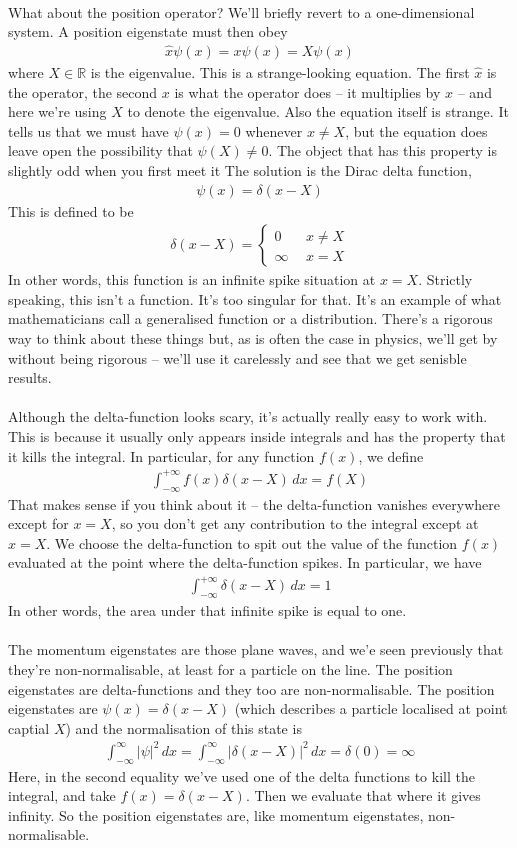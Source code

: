 \documentclass[12pt]{article}
\def\be{\begin{eqnarray}}
\def\ee{\end{eqnarray}}
\newcommand{\nn}{\nonumber}
\newcommand\para{\paragraph{}}
\newcommand{\co}{\color{olive}}
\begin{document}
{\para
What about the position operator? We'll briefly revert to a one-dimensional system. {\co A position eigenstate must then obey
%
\be  \hat{x}\psi(x) = x\psi(x) = X\psi(x)\nn\ee
%
where $X\in \mathds{R}$ is the eigenvalue.} This is a strange-looking equation. The first $\hat{x}$ is the operator, the second $x$ is what the operator does -- it multiplies by $x$ -- and here we're using $X$ to denote the eigenvalue. Also the equation itself is strange. It tells us that we must  have $\psi(x)=0$ whenever $x\neq X$, but the equation does leave open the possibility that $\psi(X)\neq 0$. The object that has this property is slightly odd when you first meet it {\co The solution  is the Dirac delta function,
%
\be \psi(x) = \delta(x-X)\nn\ee
% 
This is defined to be 
%
\be \delta(x-X) = \left\{\begin{array}{cc} 0 \ \ & x\neq X\\ \infty \ \ & x=X\end{array}\right.\nn\ee
%
} In other words, this function is an infinite spike situation at $x=X$. Strictly speaking, this isn't a function. It's too singular for that. It's an example of what mathematicians call a generalised function or a distribution. There's a rigorous way to think about these things but, as is often the case in physics, we'll get by without being rigorous -- we'll use it carelessly and see that we get senisble results. 

\para
Although the delta-function looks scary, it's actually really easy to work with. This is because it usually only appears inside integrals and has the property that it kills the integral. In particular, {\co for any function $f(x)$, we define
%
\be \int_{-\infty}^{+\infty} f(x) \delta(x-X) \,dx = f(X)\nn\ee
%
}
That makes sense if you think about it -- the delta-function vanishes everywhere except for $x=X$, so you don't get any contribution to the integral except at $x=X$. We choose the delta-function to spit out the value of the function $f(x)$ evaluated at the point where the delta-function spikes. {\co In particular, we have
%
\be \int_{-\infty}^{+\infty} \delta(x-X) \, dx=1\nn\ee
%
In other words, the area under that infinite spike is equal to one.}


\para
The momentum eigenstates are those plane waves, and we'e seen previously that they're non-normalisable, at least for a particle on the line. The position eigenstates are delta-functions and they too are non-normalisable. {\co The position eigenstates are $\psi(x) = \delta(x-X)$} (which describes a particle localised at point captial $X$) {\co and the normalisation of this state is
%
\be \int_{-\infty}^{\infty} |\psi|^2\,dx = \int_{-\infty}^{\infty} |\delta(x-X)|^2\,dx  =\delta(0) = \infty\nn\ee
%
} Here, in the second equality we've used one of the delta functions to kill the integral, and take $f(x) = \delta(x-X)$. Then we evaluate that where it gives infinity. {\co So the position eigenstates are, like momentum eigenstates, non-normalisable}. 


}
\end{document}
